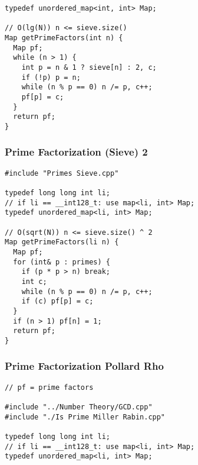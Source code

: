 \documentclass[twoside]{article}
\begin{document}
\begin{multicols*}{2}
\begin{verbatim}
typedef unordered_map<int, int> Map;

// O(lg(N)) n <= sieve.size()
Map getPrimeFactors(int n) {
  Map pf;
  while (n > 1) {
    int p = n & 1 ? sieve[n] : 2, c;
    if (!p) p = n;
    while (n % p == 0) n /= p, c++;
    pf[p] = c;
  }
  return pf;
}
\end{verbatim}

\subsubsectionfont{\large\bfseries\sffamily\underline}
\subsubsection*{Prime Factorization (Sieve) 2}
\begin{verbatim}
#include "Primes Sieve.cpp"

typedef long long int li;
// if li == __int128_t: use map<li, int> Map;
typedef unordered_map<li, int> Map;

// O(sqrt(N)) n <= sieve.size() ^ 2
Map getPrimeFactors(li n) {
  Map pf;
  for (int& p : primes) {
    if (p * p > n) break;
    int c;
    while (n % p == 0) n /= p, c++;
    if (c) pf[p] = c;
  }
  if (n > 1) pf[n] = 1;
  return pf;
}
\end{verbatim}

\subsubsectionfont{\large\bfseries\sffamily\underline}
\subsubsection*{Prime Factorization Pollard Rho}
\begin{verbatim}
// pf = prime factors

#include "../Number Theory/GCD.cpp"
#include "./Is Prime Miller Rabin.cpp"

typedef long long int li;
// if li == __int128_t: use map<li, int> Map;
typedef unordered_map<li, int> Map;


\end{verbatim}
\end{multicols*}
\end{document}

